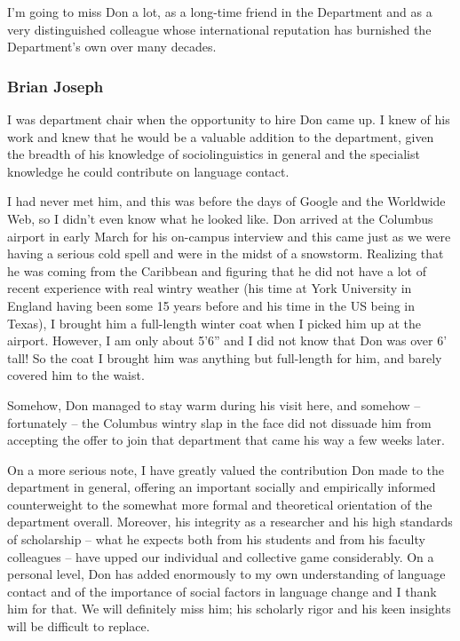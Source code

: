 \documentclass[output=paper, colorlinks,citecolor=brown]{langscibook}
\begin{document}
I’m going to miss Don a lot, as a long-time friend in the Department and as a very distinguished colleague whose international reputation has burnished the Department’s own over many decades. 

\subsubsection{Brian Joseph}
I was department chair when the opportunity to hire Don came up.  I knew of his work and knew that he would be a valuable addition to the department, given the breadth of his knowledge of sociolinguistics in general and the specialist knowledge he could contribute on language contact.

I had never met him, and this was before the days of Google and the Worldwide Web, so I didn’t even know what he looked like.  Don arrived at the Columbus airport in early March for his on-campus interview and this came just as we were having a serious cold spell and were in the midst of a snowstorm.  Realizing that he was coming from the Caribbean and figuring that he did not have a lot of recent experience with real wintry weather (his time at York University in England having been some 15 years before and his time in the US being in Texas), I brought him a full-length winter coat when I picked him up at the airport.  However, I am only about 5’6” and I did not know that Don was over 6’ tall!  So the coat I brought him was anything but full-length for him, and barely covered him to the waist.

Somehow, Don managed to stay warm during his visit here, and somehow  --  fortunately  --  the Columbus wintry slap in the face did not dissuade him from accepting the offer to join that department that came his way a few weeks later.

On a more serious note, I have greatly valued the contribution Don made to the department in general, offering an important socially and empirically informed counterweight to the somewhat more formal and theoretical orientation of the department overall. Moreover, his integrity as a researcher and his high standards of scholarship  --  what he expects both from his students and from his faculty colleagues  --  have upped our individual and collective game considerably.  On a personal level, Don has added enormously to my own understanding of language contact and of the importance of social factors in language change and I thank him for that. We will definitely miss him; his scholarly rigor and his keen insights will be difficult to replace.
\end{document}

